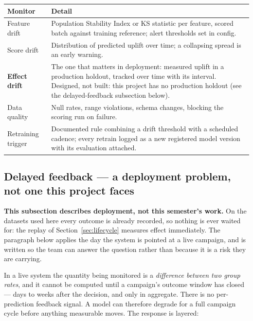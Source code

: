 \documentclass[11pt,a4paper]{article}
\begin{document}
\begin{tabularx}{\textwidth}{@{}L{4.0cm}X@{}}
\toprule
\textbf{Monitor} & \textbf{Detail} \\
\midrule
Feature drift & Population Stability Index or KS statistic per feature, scored batch against
training reference; alert thresholds set in config. \\
Score drift & Distribution of predicted uplift over time; a collapsing spread is an early warning. \\
\textbf{Effect drift} & The one that matters in deployment: measured uplift in a production
holdout, tracked over time with its interval. Designed, not built: this project has no production
holdout (see the delayed-feedback subsection below). \\
Data quality & Null rates, range violations, schema changes, blocking the scoring run on failure. \\
Retraining trigger & Documented rule combining a drift threshold with a scheduled cadence; every
retrain logged as a new registered model version with its evaluation attached. \\
\bottomrule
\end{tabularx}

\subsection{Delayed feedback --- a deployment problem, not one this project faces}

\begin{alertbox}
\textbf{This subsection describes deployment, not this semester's work.} On the datasets used here
every outcome is already recorded, so nothing is ever waited for: the replay of
Section~\ref{sec:lifecycle} measures effect immediately. The paragraph below applies the day the
system is pointed at a live campaign, and is written so the team can answer the question rather
than because it is a risk they are carrying.
\end{alertbox}

In a live system the quantity being monitored is a \emph{difference between two group rates}, and
it cannot be computed until a campaign's outcome window has closed --- days to weeks after the
decision, and only in aggregate. There is no per-prediction feedback signal. A model can therefore
degrade for a full campaign cycle before anything measurable moves. The response is layered:
\end{document}

